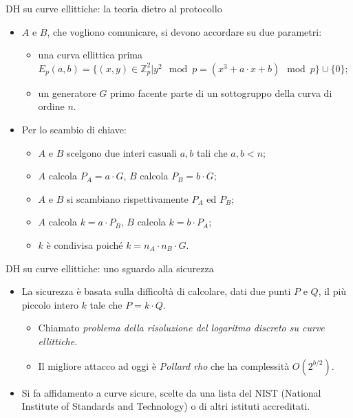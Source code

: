 \documentclass[11pt,svgnames,smaller,aspectratio=169,italian]{beamer}
\begin{document}
\begin{frame}{DH su curve ellittiche: la teoria dietro al protocollo}
	\begin{itemize}
		\item $A$ e $B$, che vogliono comunicare, si devono accordare su due parametri:
			\begin{itemize}
				\item una curva ellittica prima $E_{p}(a, b) = \{(x, y) \in \mathds{Z}_{p}^{2} | y^{2} \mod p = (x^{3} + a \cdot x + b) \mod p \} \cup \{0\}$;
				\item un generatore $G$ primo facente parte di un sottogruppo della curva di ordine $n$.
			\end{itemize}
		\item Per lo scambio di chiave:
			\begin{itemize}
				\item $A$ e $B$ scelgono due interi casuali $a, b$ tali che $a, b < n$;
				\item $A$ calcola $P_{A} = a \cdot G$, $B$ calcola $P_{B} = b \cdot G$;
				\item $A$ e $B$ si scambiano rispettivamente $P_{A}$ ed $P_{B}$;
				\item $A$ calcola $k = a \cdot P_{B}$, $B$ calcola $k = b \cdot P_{A}$;
				\item $k$ è condivisa poiché $k = n_{A} \cdot n_{B} \cdot G$.
			\end{itemize}
	\end{itemize}
\end{frame}

\begin{frame}{DH su curve ellittiche: uno sguardo alla sicurezza}
	\begin{itemize}
		\item La sicurezza è basata sulla difficoltà di calcolare, dati due punti $P$ e $Q$, il più piccolo intero $k$ tale che $P = k \cdot Q$.
			\begin{itemize}
				\item Chiamato \emph{problema della risoluzione del logaritmo discreto su curve ellittiche}.
				\item Il migliore attacco ad oggi è \emph{Pollard rho} che ha complessità $O(2^{b/2})$.
			\end{itemize}
		\item Si fa affidamento a curve sicure, scelte da una lista del NIST (National Institute of Standards and Technology) o di altri istituti accreditati.
	\end{itemize}
\end{frame}
\end{document}
